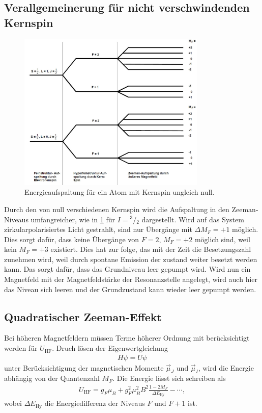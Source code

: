 \subsection{Verallgemeinerung für nicht verschwindenden Kernspin}
\begin{figure}[h!]
	\centering
	\includegraphics[width = 0.8\textwidth]{../Grafiken/BeispielAlkali.pdf}
	\caption{Energieaufspaltung für ein Atom mit Kernspin ungleich null.\cite{V21}}\label{fig:Kernspin}
\end{figure}
Durch den von null verschiedenen Kernspin wird die Aufspaltung in den Zeeman-Niveaus umfangreicher, wie in \cref{fig:Kernspin} für $I={}^3\!/\!_2$ dargestellt.
Wird auf das System zirkularpolarisiertes Licht gestrahlt, sind nur Übergänge mit $\Delta M_F=+1$ möglich.
Dies sorgt dafür, dass keine Übergänge von $F=2$, $M_F=+2$ möglich sind, weil kein $M_F=+3$ existiert.
Dies hat zur folge, das mit der Zeit die Besetzungszahl zunehmen wird, weil durch spontane Emission der zustand weiter besetzt werden kann.
Das sorgt dafür, dass das Grundniveau leer gepumpt wird.
Wird nun ein Magnetfeld mit der Magnetfeldstärke der Resonanzstelle angelegt, wird auch hier das Niveau sich leeren und der Grundzustand kann wieder leer gepumpt werden.

\newpage
\subsection{Quadratischer Zeeman-Effekt}
Bei höheren Magnetfeldern müssen Terme höherer Ordnung mit berücksichtigt werden für $U_\text{HF}$.
Druch lösen der Eigenwertgleichung 
\begin{align}
	H\psi = U\psi
\end{align}
unter Berücksichtigung der magnetischen Momente $\vec{\mu}_J$ und $\vec{\mu}_I$, wird die Energie abhängig von der Quantenzahl $M_F$.
Die Energie lässt sich schreiben als
\begin{align}
	U_\text{HF}= g_F\mu_B+g_F^2\mu_B^2B^2\frac{1-2M_F}{\Delta E_\text{Hy}}-\cdots,
	\label{eq:zeeman_effekt_quadratisch}
\end{align}
wobei $\Delta E_\text{Hy}$ die Energiedifferenz der Niveaus $F$ und $F+1$ ist.
